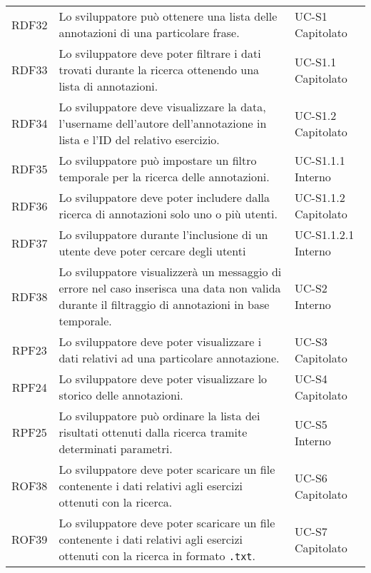 \begin{tabularx}{\textwidth}{| c | p{10cm} | X |}
		RDF32 & Lo sviluppatore può ottenere una lista delle annotazioni di una particolare frase. & UC-S1 \newline Capitolato\\
		RDF33 & Lo sviluppatore deve poter filtrare i dati trovati durante la ricerca ottenendo una lista di annotazioni. & UC-S1.1 \newline Capitolato\\
		RDF34 & Lo sviluppatore deve visualizzare la data, l'username dell'autore dell'annotazione in lista e l'ID del relativo esercizio. & UC-S1.2 \newline Capitolato\\
		RDF35 & Lo sviluppatore può impostare un filtro temporale per la ricerca delle annotazioni. & UC-S1.1.1 \newline Interno\\
		RDF36 & Lo sviluppatore deve poter includere dalla ricerca di annotazioni solo uno o più utenti. & UC-S1.1.2 \newline Capitolato\\
		RDF37 & Lo sviluppatore durante l'inclusione di un utente deve poter cercare degli utenti & UC-S1.1.2.1 \newline Interno\\		
		RDF38 & Lo sviluppatore visualizzerà un messaggio di errore nel caso inserisca una data non valida durante il filtraggio di annotazioni in base temporale. & UC-S2 \newline Interno\\
		RPF23 & Lo sviluppatore deve poter visualizzare i dati relativi ad una particolare annotazione. & UC-S3 \newline Capitolato\\
		RPF24 & Lo sviluppatore deve poter visualizzare lo storico delle annotazioni. & UC-S4 \newline Capitolato\\
		RPF25 & Lo sviluppatore può ordinare la lista dei risultati ottenuti dalla ricerca tramite determinati parametri. & UC-S5 \newline Interno\\	
		ROF38 & Lo sviluppatore deve poter scaricare un file contenente i dati relativi agli esercizi ottenuti con la ricerca. & UC-S6 \newline Capitolato\\
		ROF39 & Lo sviluppatore deve poter scaricare un file contenente i dati relativi agli esercizi ottenuti con la ricerca in formato \texttt{.txt}. & UC-S7 \newline Capitolato\\

\end{tabularx}
